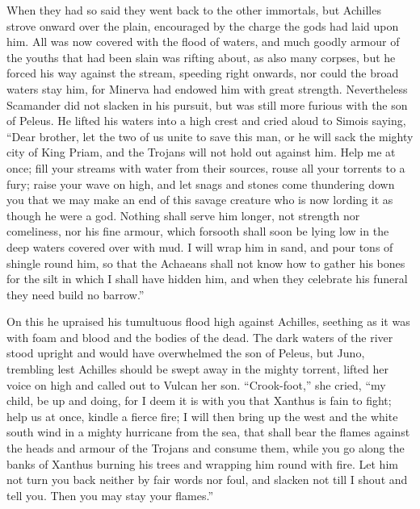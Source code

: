 When they had so said they went back to the other immortals, but Achilles
strove onward over the plain, encouraged by the charge the gods had laid
upon him. All was now covered with the flood of waters, and much goodly
armour of the youths that had been slain was rifting about, as also many
corpses, but he forced his way against the stream, speeding right onwards,
nor could the broad waters stay him, for Minerva had endowed him with
great strength. Nevertheless Scamander did not slacken in his pursuit, but
was still more furious with the son of Peleus. He lifted his waters into a
high crest and cried aloud to Simois saying, “Dear brother, let the two of
us unite to save this man, or he will sack the mighty city of King Priam,
and the Trojans will not hold out against him. Help me at once; fill your
streams with water from their sources, rouse all your torrents to a fury;
raise your wave on high, and let snags and stones come thundering down you
that we may make an end of this savage creature who is now lording it as
though he were a god. Nothing shall serve him longer, not strength nor
comeliness, nor his fine armour, which forsooth shall soon be lying low in
the deep waters covered over with mud. I will wrap him in sand, and pour
tons of shingle round him, so that the Achaeans shall not know how to
gather his bones for the silt in which I shall have hidden him, and when
they celebrate his funeral they need build no barrow.”

On this he upraised his tumultuous flood high against Achilles, seething
as it was with foam and blood and the bodies of the dead. The dark waters
of the river stood upright and would have overwhelmed the son of Peleus,
but Juno, trembling lest Achilles should be swept away in the mighty
torrent, lifted her voice on high and called out to Vulcan her son.
“Crook-foot,” she cried, “my child, be up and doing, for I deem it is with
you that Xanthus is fain to fight; help us at once, kindle a fierce fire;
I will then bring up the west and the white south wind in a mighty
hurricane from the sea, that shall bear the flames against the heads and
armour of the Trojans and consume them, while you go along the banks of
Xanthus burning his trees and wrapping him round with fire. Let him not
turn you back neither by fair words nor foul, and slacken not till I shout
and tell you. Then you may stay your flames.”

